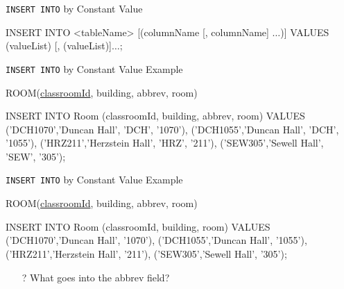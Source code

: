 \documentclass[aspectratio=169]{beamer}
\begin{document}
\begin{frame}[fragile]{\texttt{INSERT INTO} by Constant Value}

\begin{SQL}
INSERT INTO <tableName> [(columnName [, columnName] $\ldots$)] 
	VALUES (valueList) [, (valueList)]$\ldots$;
\end{SQL}

\end{frame}

\begin{frame}[fragile]{\texttt{INSERT INTO} by Constant Value Example}

ROOM(\underline{classroomId}, building, abbrev, room)

\begin{SQL}
INSERT INTO Room (classroomId, building, abbrev, room) VALUES
   ('DCH1070','Duncan Hall', 'DCH', '1070'),
   ('DCH1055','Duncan Hall', 'DCH', '1055'),
   ('HRZ211','Herzstein Hall', 'HRZ', '211'),
   ('SEW305','Sewell Hall', 'SEW', '305');
\end{SQL}

\end{frame}


\begin{frame}[fragile]{\texttt{INSERT INTO} by Constant Value Example}

ROOM(\underline{classroomId}, building, abbrev, room)

\begin{SQL}
INSERT INTO Room (classroomId, building, room) VALUES
   ('DCH1070','Duncan Hall', '1070'),
   ('DCH1055','Duncan Hall', '1055'),
   ('HRZ211','Herzstein Hall',  '211'),
   ('SEW305','Sewell Hall',  '305');
\end{SQL}

\begin{itemize}
\item[?] What goes into the abbrev field?
\end{itemize}

\end{frame}
\end{document}
